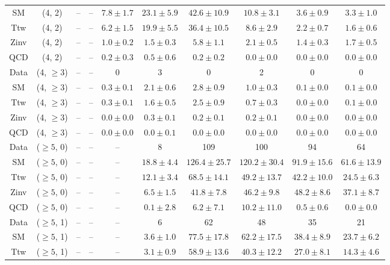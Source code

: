 \begin{table}[h!]
{\begin{tabular}{cccccccccc}
	SM & (4, 2) & -- & -- & $7.8\pm 1.7$ & $23.1\pm 5.9$ & $42.6\pm 10.9$ & $10.8\pm 3.1$ & $3.6\pm 0.9$ & $3.3\pm 1.0$ \\[0.5ex] 
	Ttw & (4, 2) & -- & -- & $6.2\pm 1.5$ & $19.9\pm 5.5$ & $36.4\pm 10.5$ & $8.6\pm 2.9$ & $2.2\pm 0.7$ & $1.6\pm 0.6$ \\[0.5ex] 
	Zinv & (4, 2) & -- & -- & $1.0\pm 0.2$ & $1.5\pm 0.3$ & $5.8\pm 1.1$ & $2.1\pm 0.5$ & $1.4\pm 0.3$ & $1.7\pm 0.5$ \\[0.5ex] 
	QCD & (4, 2) & -- & -- & $0.2\pm 0.3$ & $0.5\pm 0.6$ & $0.2\pm 0.2$ & $0.0\pm 0.0$ & $0.0\pm 0.0$ & $0.0\pm 0.0$ \\[0.5ex] 
	Data & (4, $\ge3$) & -- & -- & 0 & 3 & 0 & 2 & 0 & 0 \\[0.5ex] 
	SM & (4, $\ge3$) & -- & -- & $0.3\pm 0.1$ & $2.1\pm 0.6$ & $2.8\pm 0.9$ & $1.0\pm 0.3$ & $0.1\pm 0.0$ & $0.1\pm 0.0$ \\[0.5ex] 
	Ttw & (4, $\ge3$) & -- & -- & $0.3\pm 0.1$ & $1.6\pm 0.5$ & $2.5\pm 0.9$ & $0.7\pm 0.3$ & $0.0\pm 0.0$ & $0.1\pm 0.0$ \\[0.5ex] 
	Zinv & (4, $\ge3$) & -- & -- & $0.0\pm 0.0$ & $0.3\pm 0.1$ & $0.2\pm 0.1$ & $0.2\pm 0.1$ & $0.0\pm 0.0$ & $0.0\pm 0.0$ \\[0.5ex] 
	QCD & (4, $\ge3$) & -- & -- & $0.0\pm 0.0$ & $0.0\pm 0.1$ & $0.0\pm 0.0$ & $0.0\pm 0.0$ & $0.0\pm 0.0$ & $0.0\pm 0.0$ \\[0.5ex] 
	Data & ($\ge5$, 0) & -- & -- & -- & 8 & 109 & 100 & 94 & 64 \\[0.5ex] 
	SM & ($\ge5$, 0) & -- & -- & -- & $18.8\pm 4.4$ & $126.4\pm 25.7$ & $120.2\pm 30.4$ & $91.9\pm 15.6$ & $61.6\pm 13.9$ \\[0.5ex] 
	Ttw & ($\ge5$, 0) & -- & -- & -- & $12.1\pm 3.4$ & $68.5\pm 14.1$ & $49.2\pm 13.7$ & $42.2\pm 10.0$ & $24.5\pm 6.3$ \\[0.5ex] 
	Zinv & ($\ge5$, 0) & -- & -- & -- & $6.5\pm 1.5$ & $41.8\pm 7.8$ & $46.2\pm 9.8$ & $48.2\pm 8.6$ & $37.1\pm 8.7$ \\[0.5ex] 
	QCD & ($\ge5$, 0) & -- & -- & -- & $0.1\pm 2.8$ & $6.2\pm 7.1$ & $10.2\pm 11.0$ & $0.5\pm 0.6$ & $0.0\pm 0.0$ \\[0.5ex] 
	Data & ($\ge5$, 1) & -- & -- & -- & 6 & 62 & 48 & 35 & 21 \\[0.5ex] 
	SM & ($\ge5$, 1) & -- & -- & -- & $3.6\pm 1.0$ & $77.5\pm 17.8$ & $62.2\pm 17.5$ & $38.4\pm 8.9$ & $23.7\pm 6.2$ \\[0.5ex] 
	Ttw & ($\ge5$, 1) & -- & -- & -- & $3.1\pm 0.9$ & $58.9\pm 13.6$ & $40.3\pm 12.2$ & $27.0\pm 8.1$ & $14.3\pm 4.6$ \\[0.5ex] 

\end{tabular}}
\end{table}
